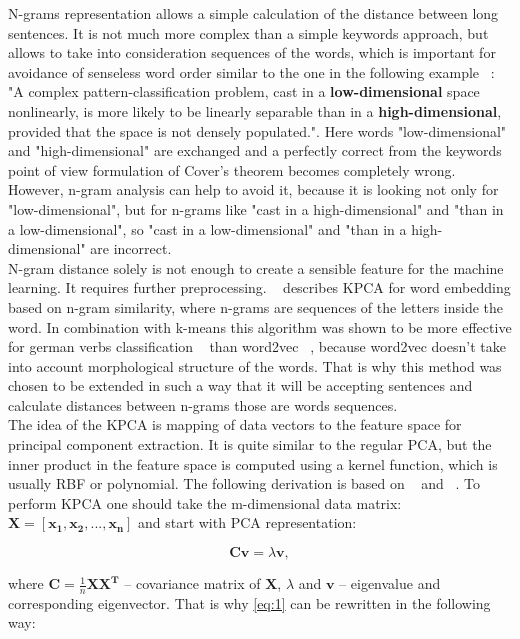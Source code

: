 \documentclass[11pt]{report}
\numberwithin{equation}{section} %
\begin{document}
N-grams representation allows a simple calculation of the distance between long sentences. It is not much more complex than a simple keywords approach, but allows to take into consideration sequences of the words, which is important for avoidance of senseless word order similar to the one in the following example  ~\cite{cover}: "A complex pattern-classification problem, cast in a \textbf{low-dimensional} space nonlinearly, is more likely to be linearly separable than in a \textbf{high-dimensional}, provided that the space is not densely populated.". Here words "low-dimensional" and "high-dimensional" are exchanged and a perfectly correct from the keywords point of view formulation of Cover's theorem becomes completely wrong. However, n-gram analysis can help to avoid it, because it is looking not only for "low-dimensional", but for n-grams like "cast in a high-dimensional" and "than in a low-dimensional", so  "cast in a low-dimensional" and "than in a high-dimensional" are incorrect.\\

N-gram distance solely is not enough to create a sensible feature for the machine learning. It requires further preprocessing. ~\cite{eduardo} describes KPCA for word embedding based on n-gram similarity, where n-grams are sequences of the letters inside the word. In combination with k-means this algorithm was shown to be more effective for german verbs classification ~\cite{eduardo} than word2vec ~\cite{word2vec}, because word2vec doesn't take into account morphological structure of the words. That is why this method was chosen to be extended in such a way that it will be accepting sentences and calculate distances between n-grams those are words sequences.\\

The idea of the KPCA is mapping of data vectors to the feature space for principal component extraction. It is quite similar to the regular PCA, but the inner product in the feature space is computed using a kernel function, which is usually RBF or polynomial. The following derivation is based on ~\cite{eduardo} and  ~\cite{readingGroup}. To perform KPCA one should take the m-dimensional data matrix: $\pmb{X} = [\pmb{x_1}, \pmb{x_2}, ..., \pmb{x_n}]$ and start with PCA representation:

\begin{equation} \label{eq:1}
\pmb{Cv}=\lambda \pmb{v},
\end{equation}

where $\pmb{C} = \frac{1}{n}\pmb{XX^T}$ -- covariance matrix of  $\pmb{X}$, $\lambda$ and $\pmb{v}$ -- eigenvalue and corresponding eigenvector. That is why \ref{eq:1} can be rewritten in the following way:
\end{document}
